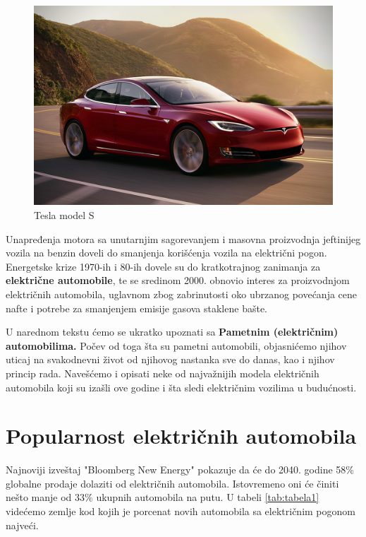 \documentclass[a4paper]{article}
\begin{document}
\begin{figure}[h]
        \centering
        \includegraphics[width=\linewidth]{tesla.jpeg}
        \caption{Tesla model S}
        \label{fig:IMG_Tesla}
        \end{figure}
        Unapređenja motora sa unutarnjim sagorevanjem i masovna proizvodnja jeftinijeg vozila na benzin doveli do smanjenja korišćenja vozila na električni pogon.
         Energetske krize 1970-ih i 80-ih dovele su do kratkotrajnog zanimanja za \textbf{električne automobile}, te se sredinom 2000. obnovio interes za proizvodnjom električnih automobila, uglavnom zbog zabrinutosti oko ubrzanog povećanja cene nafte i potrebe za smanjenjem emisije gasova staklene bašte.

         U narednom tekstu ćemo se ukratko upoznati sa \textbf{Pametnim (električnim) automobilima.} Počev od toga šta su pametni automobili, objasnićemo njihov uticaj na svakodnevni život od njihovog nastanka sve do danas, kao i njihov princip rada. Navešćemo i opisati neke od najvažnijih modela električnih automobila koji su izašli ove godine i šta sledi električnim vozilima u budućnosti.
         
\label{sec:uvod}






\section{Popularnost električnih automobila}
\label{slike_i_tabele}

Najnoviji izveštaj "Bloomberg New Energy" pokazuje da će do 2040. godine 58\% globalne prodaje dolaziti od električnih automobila. Istovremeno oni će činiti nešto manje od 33\% ukupnih automobila na putu. U tabeli \ref{tab:tabela1} videćemo zemlje kod kojih je porcenat novih automobila sa električnim pogonom najveći.
\end{document}
